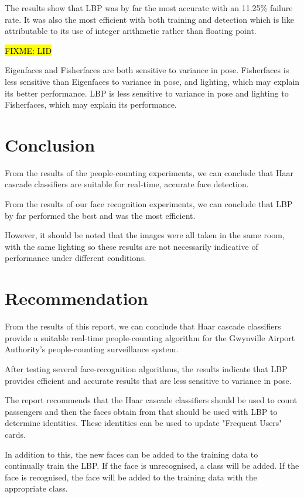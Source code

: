 \documentclass{article}
\begin{document}
The results show that LBP was by far the most accurate with an 11.25\% failure rate. It was also the most efficient with both training and detection which is like attributable to its use of integer arithmetic rather than floating point.

\hl{FIXME: LID}

Eigenfaces and Fisherfaces are both sensitive to variance in pose. Fisherfaces is less sensitive than Eigenfaces to variance in pose, and lighting, which may explain its better performance. LBP is less sensitive to variance in pose and lighting to Fisherfaces, which may explain its performance.

\section{Conclusion}
From the results of the people-counting experiments, we can conclude that Haar cascade classifiers are suitable for real-time, accurate face detection.

From the results of our face recognition experiments, we can conclude that LBP by far performed the best and was the most efficient.

However, it should be noted that the images were all taken in the same room, with the same lighting so these results are not necessarily indicative of performance under different conditions.

\section{Recommendation}
From the results of this report, we can conclude that Haar cascade classifiers provide a suitable real-time people-counting algorithm for the Gwynville Airport Authority's  people-counting surveillance system.

After testing several face-recognition algorithms, the results indicate that LBP provides efficient and accurate results that are less sensitive to variance in pose.

The report recommends that the Haar cascade classifiers should be used to count passengers and then the faces obtain from that should be used with LBP to determine identities. These identities can be used to update "Frequent Users" cards.

In addition to this, the new faces can be added to the training data to continually train the LBP. If the face is unrecognised, a class will be added. If the face is recognised, the face will be added to the training data with the appropriate class.
\end{document}

